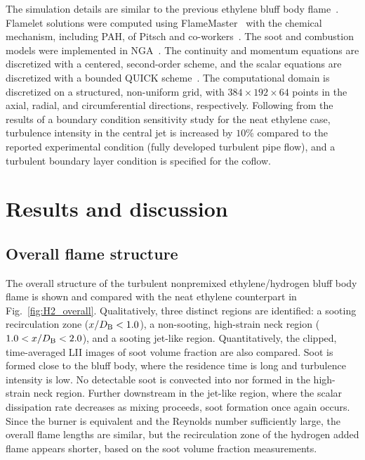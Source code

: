 \documentclass[review,3p,times]{elsarticle}
\begin{document}
The simulation details are similar to the previous ethylene bluff body flame~\cite{mueller13}.  Flamelet solutions were computed using FlameMaster~\cite{FlameMaster} with the chemical mechanism, including PAH, of Pitsch and co-workers~\cite{blanquart09b,narayanaswamy10}.  The soot and combustion models were implemented in NGA~\cite{desjardins08}.  The continuity and momentum equations are discretized with a centered, second-order scheme, and the scalar equations are discretized with a bounded QUICK scheme~\cite{herrmann06}.  The computational domain is discretized on a structured, non-uniform grid, with $384 \times 192 \times 64$ points in the axial, radial, and circumferential directions, respectively.  Following from the results of a boundary condition sensitivity study for the neat ethylene case, turbulence intensity in the central jet is increased by $10$\% compared to the reported experimental condition (fully developed turbulent pipe flow), and a turbulent boundary layer condition is specified for the coflow.  


\section{Results and discussion}

\subsection{Overall flame structure}

The overall structure of the turbulent nonpremixed ethylene/hydrogen bluff body flame is shown and compared with the neat ethylene counterpart in Fig.~\ref{fig:H2_overall}.  Qualitatively, three distinct regions are identified: a sooting recirculation zone ($x/D_{\rm B} < 1.0$), a non-sooting, high-strain neck region ($1.0 < x/D_{\rm B} < 2.0$), and a sooting jet-like region.  Quantitatively, the clipped, time-averaged LII images of soot volume fraction are also compared.  Soot is formed close to the bluff body, where the residence time is long and turbulence intensity is low.  No detectable soot is convected into nor formed in the high-strain neck region.   Further downstream in the jet-like region, where the scalar dissipation rate decreases as mixing proceeds, soot formation once again occurs.  Since the burner is equivalent and the Reynolds number sufficiently large, the overall flame lengths are similar, but the recirculation zone of the hydrogen added flame appears shorter, based on the soot volume fraction measurements.
\end{document}
